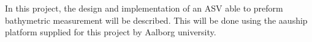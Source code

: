 %
In this project, the design and implementation of an ASV able to preform bathymetric measurement will be described. 
This will be done using the aauship platform supplied for this project by Aalborg university. 
